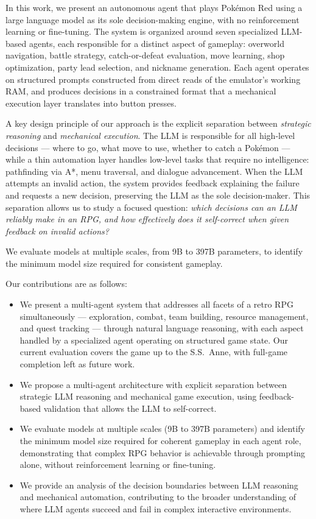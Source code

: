 \documentclass{article}
\begin{document}
In this work, we present an autonomous agent that plays Pok\'{e}mon Red using a large language model as its sole decision-making engine, with no reinforcement learning or fine-tuning. The system is organized around seven specialized LLM-based agents, each responsible for a distinct aspect of gameplay: overworld navigation, battle strategy, catch-or-defeat evaluation, move learning, shop optimization, party lead selection, and nickname generation. Each agent operates on structured prompts constructed from direct reads of the emulator's working RAM, and produces decisions in a constrained format that a mechanical execution layer translates into button presses.

A key design principle of our approach is the explicit separation between \emph{strategic reasoning} and \emph{mechanical execution}. The LLM is responsible for all high-level decisions --- where to go, what move to use, whether to catch a Pok\'{e}mon --- while a thin automation layer handles low-level tasks that require no intelligence: pathfinding via A*, menu traversal, and dialogue advancement. When the LLM attempts an invalid action, the system provides feedback explaining the failure and requests a new decision, preserving the LLM as the sole decision-maker. This separation allows us to study a focused question: \emph{which decisions can an LLM reliably make in an RPG, and how effectively does it self-correct when given feedback on invalid actions?}

We evaluate models at multiple scales, from 9B to 397B parameters, to identify the minimum model size required for consistent gameplay.

Our contributions are as follows:
\begin{itemize}
  \item We present a multi-agent system that addresses all facets of a retro RPG simultaneously --- exploration, combat, team building, resource management, and quest tracking --- through natural language reasoning, with each aspect handled by a specialized agent operating on structured game state. Our current evaluation covers the game up to the S.S.\ Anne, with full-game completion left as future work.
  \item We propose a multi-agent architecture with explicit separation between strategic LLM reasoning and mechanical game execution, using feedback-based validation that allows the LLM to self-correct.
  \item We evaluate models at multiple scales (9B to 397B parameters) and identify the minimum model size required for coherent gameplay in each agent role, demonstrating that complex RPG behavior is achievable through prompting alone, without reinforcement learning or fine-tuning.
  \item We provide an analysis of the decision boundaries between LLM reasoning and mechanical automation, contributing to the broader understanding of where LLM agents succeed and fail in complex interactive environments.
\end{itemize}
\end{document}
